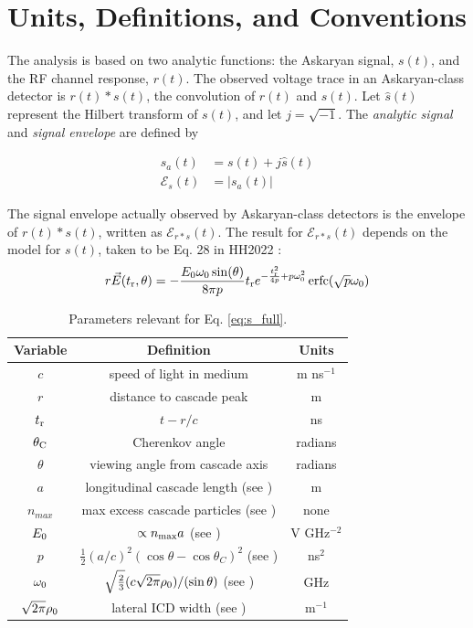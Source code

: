\documentclass[amsmath,amssymb,aps,prd,10pt,twocolumn,showkeys]{revtex4}
\DeclareMathOperator\erfc{erfc}
\begin{document}
\section{Units, Definitions, and Conventions}
\label{sec:unit}

The analysis is based on two analytic functions: the Askaryan signal, $s(t)$, and the RF channel response, $r(t)$.  The observed voltage trace in an Askaryan-class detector is $r(t) * s(t)$, the convolution of $r(t)$ and $s(t)$.  Let $\hat{s}(t)$ represent the Hilbert transform of $s(t)$, and let $j=\sqrt{-1}$.  The \textit{analytic signal} and \textit{signal envelope} are defined by 

\begin{align}
s_a(t) &= s(t) + j\hat{s}(t) \\
\mathcal{E}_s(t) &= |s_a(t)|
\end{align}

The signal envelope actually observed by Askaryan-class detectors is the envelope of $r(t) * s(t)$, written as $\mathcal{E}_{r*s}(t)$.  The result for $\mathcal{E}_{r*s}(t)$ depends on the model for $s(t)$, taken to be Eq. 28 in HH2022 \cite{PhysRevD.105.123019}:
\begin{equation}
r\vec{E}(t_{\rm r},\theta) = -\frac{E_0\omega_0 \sin(\theta)}{8\pi p}t_{\rm r}e^{-\frac{t_{\rm r}^2}{4p}+p\omega_0^2}\erfc(\sqrt{p}\omega_0) \label{eq:s_full}
\end{equation}
\begin{table}
\begin{tabular}{| c | c | c |} \hline
\textbf{Variable} & \textbf{Definition} & \textbf{Units}\\ \hline
$c$ & speed of light in medium & m ns$^{-1}$ \\ 
$r$ & distance to cascade peak & m \\
$t_{\rm r}$ & $t-r/c$ & ns \\
$\theta_{\rm C}$ & Cherenkov angle & radians \\ 
$\theta$ & viewing angle from cascade axis & radians \\ 
$a$ & longitudinal cascade length (see \cite{10.1103/physrevd.65.016003}) & m \\ 
$n_{max}$ & max excess cascade particles (see \cite{10.1103/physrevd.65.016003})  & none \\
$E_{\rm 0}$ & $\propto n_{\rm max}a$ (see \cite{10.1103/physrevd.65.016003}) & V GHz$^{-2}$ \\
$p$ & $\frac{1}{2}(a/c)^2 \left(\cos\theta - \cos\theta_C\right)^2$ (see \cite{PhysRevD.105.123019}) & ns$^2$ \\ 
$\omega_{\rm 0}$ & $\sqrt{\frac{2}{3}} (c\sqrt{2\pi}\rho_{\rm 0})/(\sin\theta)$ (see \cite{10.1016/j.astropartphys.2017.03.008}) & GHz \\
$\sqrt{2\pi}\rho_{\rm 0}$ & lateral ICD width (see \cite{10.1016/j.astropartphys.2017.03.008}) & m$^{-1}$ \\ \hline
\end{tabular}
\caption{\label{tab:param} Parameters relevant for Eq. \ref{eq:s_full}.}
\end{table}
\end{document}
